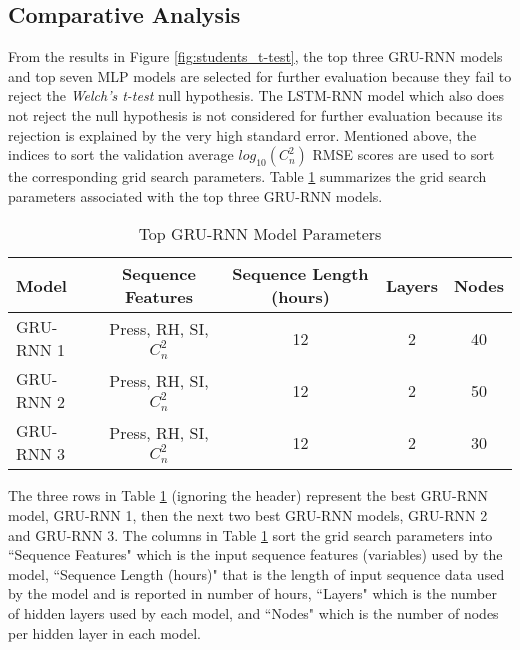 \subsection{Comparative Analysis}
From the results in Figure \ref{fig:students_t-test}, the top three \ac{GRU-RNN} models and top seven \ac{MLP} models are selected for further evaluation because they fail to reject the \textit{Welch's t-test} null hypothesis. The \ac{LSTM-RNN} model which also does not reject the null hypothesis is not considered for further evaluation because its rejection is explained by the very high standard error. Mentioned above, the indices to sort the validation average $log_{10}(C_{n}^{2})$ RMSE scores are used to sort the corresponding grid search parameters. Table \ref{tab:grid_search_results_GRU} summarizes the grid search parameters associated with the top three \ac{GRU-RNN} models.
\begin{table}[h!]
	\begin{center}
		\caption{Top GRU-RNN Model Parameters}
		\label{tab:grid_search_results_GRU}
		\begin{tabular}{||l|c|c|c|c||}
			\hline
			Model & Sequence Features & Sequence Length (hours) & Layers & Nodes \\
			\hline
			\hline
			GRU-RNN 1 & Press, RH, SI, $C_{n}^{2}$ & 12 & 2 & 40 \\
			\hline
			GRU-RNN 2 & Press, RH, SI, $C_{n}^{2}$ & 12 & 2 & 50 \\
			\hline
			GRU-RNN 3 & Press, RH, SI, $C_{n}^{2}$ & 12 & 2 & 30 \\
			\hline
		\end{tabular}
	\end{center}
\end{table}
The three rows in Table \ref{tab:grid_search_results_GRU} (ignoring the header) represent the best \ac{GRU-RNN} model, \ac{GRU-RNN} 1, then the next two best \ac{GRU-RNN} models, \ac{GRU-RNN} 2 and \ac{GRU-RNN} 3. The columns in Table \ref{tab:grid_search_results_GRU} sort the grid search parameters into ``Sequence Features" which is the input sequence features (variables) used by the model, ``Sequence Length (hours)" that is the length of input sequence data used by the model and is reported in number of hours, ``Layers" which is the number of hidden layers used by each model, and ``Nodes" which is the number of nodes per hidden layer in each model.

